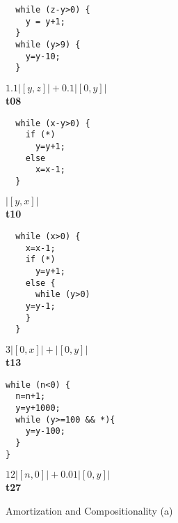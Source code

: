 \documentclass[nocopyrightspace,preprint]{sigplanconf}
\begin{document}
\begin{figure*}[t!]
\setlength{\progwidth}{.24\linewidth}
  \centering

  \begin{minipage}[b]{\progwidth}
    \begin{center}
   \begin{lstlisting}
  while (z-y>0) {
    y = y+1;
  }
  while (y>9) {
    y=y-10;
  }
   \end{lstlisting}

$1.1|[y,z]| + 0.1|[0,y]|$
\\[.7\baselineskip] 
      {\bf t08}
    \end{center}
  \end{minipage}
%
%
%
  \begin{minipage}[b]{\progwidth}
    \begin{center}
   \begin{lstlisting}
  while (x-y>0) {
    if (*)
      y=y+1;
    else
      x=x-1;
  }
   \end{lstlisting}

$|[y,x]|$
\\[.7\baselineskip]
      {\bf t10}
    \end{center}
  \end{minipage}
%
%
%
  \begin{minipage}[b]{\progwidth}
    \begin{center}
   \begin{lstlisting}
  while (x>0) {
    x=x-1;
    if (*) 
      y=y+1;
    else {
      while (y>0)
	y=y-1;
    }
  }
   \end{lstlisting}

$3|[0,x]| + |[0,y]|$
\\[.7\baselineskip]
      {\bf t13}
    \end{center}
  \end{minipage}
%
%
%
  \begin{minipage}[b]{\progwidth}
    \begin{center}
   \begin{lstlisting}
while (n<0) {
  n=n+1;
  y=y+1000;
  while (y>=100 && *){
    y=y-100;
  }
}
   \end{lstlisting}

$12|[n,0]| + 0.01|[0,y]|$
\\[.7\baselineskip]
      {\bf t27}
    \end{center}
  \end{minipage}
   \caption{Amortization and Compositionality (a)}
  \label{fig:cat1a}
\end{figure*}
\end{document}
